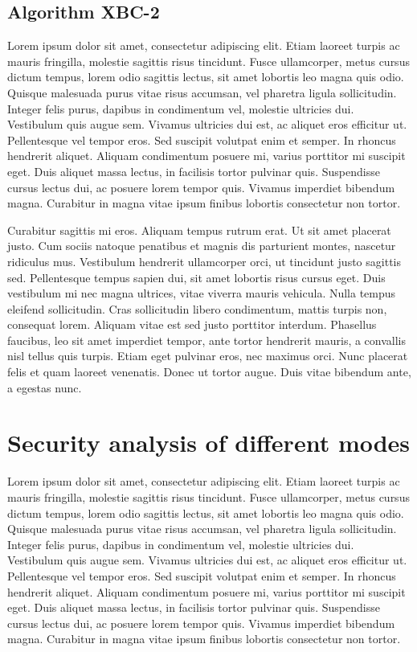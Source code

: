 \documentclass[conference]{IEEEtran}
\begin{document}
\subsection{Algorithm XBC-2}

Lorem ipsum dolor sit amet, consectetur adipiscing elit. Etiam laoreet turpis ac mauris fringilla, molestie sagittis risus tincidunt. Fusce ullamcorper, metus cursus dictum tempus, lorem odio sagittis lectus, sit amet lobortis leo magna quis odio. Quisque malesuada purus vitae risus accumsan, vel pharetra ligula sollicitudin. Integer felis purus, dapibus in condimentum vel, molestie ultricies dui. Vestibulum quis augue sem. Vivamus ultricies dui est, ac aliquet eros efficitur ut. Pellentesque vel tempor eros. Sed suscipit volutpat enim et semper. In rhoncus hendrerit aliquet. Aliquam condimentum posuere mi, varius porttitor mi suscipit eget. Duis aliquet massa lectus, in facilisis tortor pulvinar quis. Suspendisse cursus lectus dui, ac posuere lorem tempor quis. Vivamus imperdiet bibendum magna. Curabitur in magna vitae ipsum finibus lobortis consectetur non tortor.

Curabitur sagittis mi eros. Aliquam tempus rutrum erat. Ut sit amet placerat justo. Cum sociis natoque penatibus et magnis dis parturient montes, nascetur ridiculus mus. Vestibulum hendrerit ullamcorper orci, ut tincidunt justo sagittis sed. Pellentesque tempus sapien dui, sit amet lobortis risus cursus eget. Duis vestibulum mi nec magna ultrices, vitae viverra mauris vehicula. Nulla tempus eleifend sollicitudin. Cras sollicitudin libero condimentum, mattis turpis non, consequat lorem. Aliquam vitae est sed justo porttitor interdum. Phasellus faucibus, leo sit amet imperdiet tempor, ante tortor hendrerit mauris, a convallis nisl tellus quis turpis. Etiam eget pulvinar eros, nec maximus orci. Nunc placerat felis et quam laoreet venenatis. Donec ut tortor augue. Duis vitae bibendum ante, a egestas nunc.


\section{Security analysis of different modes}

Lorem ipsum dolor sit amet, consectetur adipiscing elit. Etiam laoreet turpis ac mauris fringilla, molestie sagittis risus tincidunt. Fusce ullamcorper, metus cursus dictum tempus, lorem odio sagittis lectus, sit amet lobortis leo magna quis odio. Quisque malesuada purus vitae risus accumsan, vel pharetra ligula sollicitudin. Integer felis purus, dapibus in condimentum vel, molestie ultricies dui. Vestibulum quis augue sem. Vivamus ultricies dui est, ac aliquet eros efficitur ut. Pellentesque vel tempor eros. Sed suscipit volutpat enim et semper. In rhoncus hendrerit aliquet. Aliquam condimentum posuere mi, varius porttitor mi suscipit eget. Duis aliquet massa lectus, in facilisis tortor pulvinar quis. Suspendisse cursus lectus dui, ac posuere lorem tempor quis. Vivamus imperdiet bibendum magna. Curabitur in magna vitae ipsum finibus lobortis consectetur non tortor.
\end{document}
